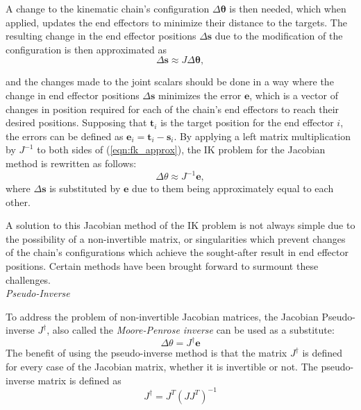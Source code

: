 A change to the kinematic chain's configuration \(\Delta \bm{\theta}\) is then
needed, which when applied, updates the end effectors to minimize their distance
to the targets. The resulting change in the end effector positions \(\Delta
\mathbf{s}\) due to the modification of the configuration is then approximated
as
\begin{equation}
    \Delta \mathbf{s} \approx J \Delta \bm{\theta},
    \label{eqn:fk_approx}
\end{equation}

\noindent and the changes made to the joint scalars should be done in a way
where the change in end effector positions \(\Delta\mathbf{s}\) minimizes the
error \(\mathbf{e}\), which is a vector of changes in position required for each
of the chain's end effectors to reach their desired positions. Supposing that
\(\mathbf{t}_i\) is the target position for the end effector \(i\), the errors
can be defined as \(\mathbf{e}_i = \mathbf{t}_i - \mathbf{s}_i\). By applying a left
matrix multiplication by \(J^{-1}\) to both sides of (\ref{eqn:fk_approx}), the
IK problem for the Jacobian method is rewritten as follows: 
\begin{equation} 
    \Delta \theta \approx J^{-1}\mathbf{e},
\end{equation}
\noindent where \(\Delta\mathbf{s}\) is substituted by \(\mathbf{e}\) due to
them being approximately equal to each other.

A solution to this Jacobian method of the IK problem is not always simple due to
the possibility of a non-invertible matrix, or singularities which prevent
changes of the chain's configurations which achieve the sought-after result in
end effector positions. Certain methods have been brought forward to surmount
these challenges. \\

\noindent\textit{Pseudo-Inverse}

To address the problem of non-invertible Jacobian matrices, the Jacobian
Pseudo-inverse \(J^\dagger\), also called the \textit{Moore-Penrose inverse}
\cite{golub_matrix3} can be used as
a substitute:
\begin{equation}
    \Delta \theta = J^{\dagger}\mathbf{e}
\end{equation}
The benefit of using the pseudo-inverse method is that the matrix \(J^\dagger\)
is defined for every case of the Jacobian matrix, whether it is invertible or
not. The pseudo-inverse matrix is defined as
\begin{equation}
    J^\dagger = J^T (J J^T)^{-1}
\end{equation}

